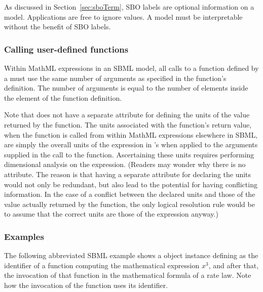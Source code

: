 As discussed in Section~\ref{sec:sboTerm}, SBO labels are optional
information on a model.  Applications are free to ignore
 values.  A model must be interpretable without the
benefit of SBO labels.




\subsubsection{Calling user-defined functions}
\label{sec:functiondefinition-calling}

Within MathML expressions in an SBML model, all calls to a
function defined by a \FunctionDefinition must use the same number
of arguments as specified in the function's definition.  The
number of arguments is equal to the number of 
elements inside the  element of the function
definition.



Note that \FunctionDefinition does not have a separate attribute
for defining the units of the value returned by the function.  The
units associated with the function's return value, when the
function is called from within MathML expressions elsewhere in
SBML, are simply the overall units of the expression in \FunctionDefinition's
 when applied to the arguments supplied in the call to
the function.  Ascertaining these units requires performing
dimensional analysis on the expression.  (Readers may wonder why
there is no attribute.  The reason is that having a separate
attribute for declaring the units would not only be redundant, but
also lead to the potential for having conflicting information.  In
the case of a conflict between the declared units and those of the
value actually returned by the function, the only logical
resolution rule would be to assume that the correct units are
those of the expression anyway.)


\subsubsection{Examples}

The following abbreviated SBML example shows a \FunctionDefinition
object instance defining  as the identifier of a function
computing the mathematical expression $x^{3}$, and after that, the
invocation of that function in the mathematical formula of a rate
law.  Note how the invocation of the function uses its identifier.


